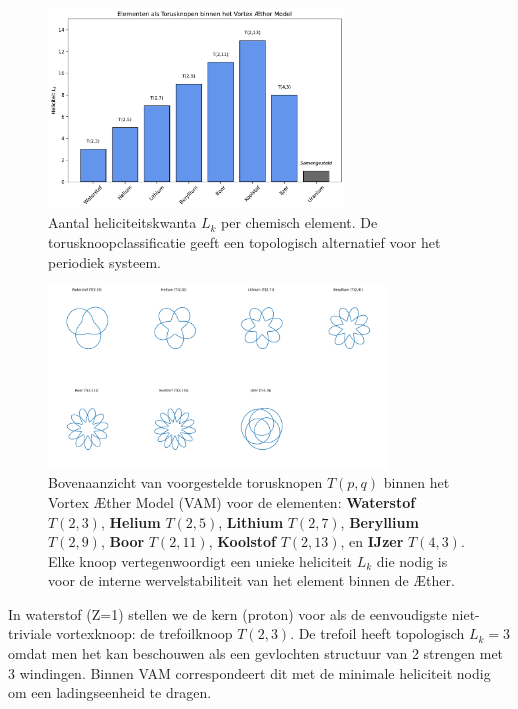 \begin{figure}[H]
    \centering
    \includegraphics[width=0.7\textwidth]{../2_elementenTorusknopen}
    \caption{Aantal heliciteitskwanta $L_k$ per chemisch element. De torusknoopclassificatie geeft een topologisch alternatief voor het periodiek systeem.}
    \label{fig:elementen_torusknoop}
\end{figure}

\begin{figure}[H]
    \centering
    \includegraphics[width=0.8\textwidth]{../0_eersteKnopen}
    \caption[Torusknopen voor lichte elementen (bovenaanzicht)]{
        Bovenaanzicht van voorgestelde torusknopen \( T(p, q) \) binnen het Vortex Æther Model (VAM) voor de elementen:
        \textbf{Waterstof} \(T(2,3)\),
        \textbf{Helium} \(T(2,5)\),
        \textbf{Lithium} \(T(2,7)\),
        \textbf{Beryllium} \(T(2,9)\),
        \textbf{Boor} \(T(2,11)\),
        \textbf{Koolstof} \(T(2,13)\), en
        \textbf{IJzer} \(T(4,3)\).
        Elke knoop vertegenwoordigt een unieke heliciteit \( L_k \) die nodig is voor de interne wervelstabiliteit van het element binnen de Æther.
    }
    \label{fig:torusknopen_top}
\end{figure}


In waterstof (Z=1) stellen we de kern (proton) voor als de eenvoudigste niet-triviale vortexknoop: de trefoilknoop $T(2,3)$. De trefoil heeft topologisch $L_k=3$ omdat men het kan beschouwen als een gevlochten structuur van 2 strengen met 3 windingen. Binnen VAM correspondeert dit met de minimale heliciteit nodig om een ladingseenheid te dragen.

